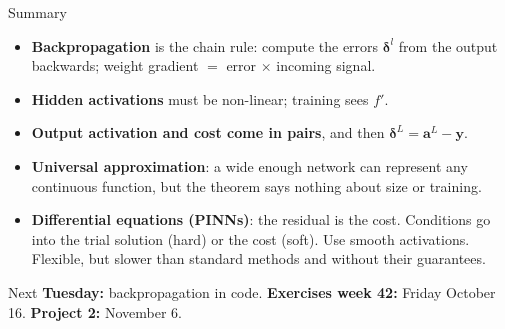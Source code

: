\documentclass[10pt,aspectratio=169]{beamer}
\begin{document}
\begin{frame}{Summary}
\begin{itemize}
  \item \textbf{Backpropagation} is the chain rule: compute the errors
        $\bm{\delta}^{l}$ from the output backwards; weight gradient $=$
        error $\times$ incoming signal.
  \item \textbf{Hidden activations} must be non-linear; training sees $f'$.
  \item \textbf{Output activation and cost come in pairs}, and then
        $\bm{\delta}^{L}=\bm{a}^{L}-\bm{y}$.
  \item \textbf{Universal approximation}: a wide enough network can
        represent any continuous function, but the theorem says nothing
        about size or training.
  \item \textbf{Differential equations (PINNs)}: the residual is the cost.
        Conditions go into the trial solution (hard) or the cost (soft).
        Use smooth activations.  Flexible, but slower than standard
        methods and without their guarantees.
\end{itemize}
\vspace{4pt}
\begin{block}{Next}
\textbf{Tuesday:} backpropagation in code.  \textbf{Exercises week 42:}
Friday October 16.  \textbf{Project 2:} November 6.
\end{block}
\end{frame}
\end{document}
